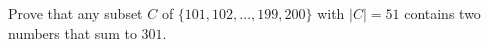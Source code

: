 \documentclass[12pt]{article}
\begin{document}
\newpage


\begin{problem}{7}
    Prove that any subset $C$ of $\{101, 102, \ldots, 199, 200\}$ with $|C|=51$ contains two numbers that sum to $301$.

    \vspace{6cm}

%

\end{problem}

\newpage
\end{document}

